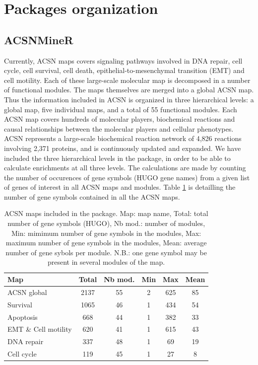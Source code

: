 \documentclass[article]{jss}
\begin{document}
\section[Packages organization]{Packages organization}

\subsection{ACSNMineR}
Currently, ACSN maps covers signaling pathways involved in DNA repair, cell
cycle, cell survival, cell death, epithelial-to-mesenchymal transition (EMT) and
cell motility. Each of these large-scale molecular map is decomposed in a number
of functional modules. The maps themselves are merged into a global ACSN map.
Thus the information included in ACSN is organized in three hierarchical levels:
a global map, five individual maps, and a total of 55 functional modules. Each
ACSN map covers hundreds of molecular players, biochemical reactions and causal
relationships between the molecular players and cellular phenotypes.  ACSN
represents a large-scale biochemical reaction network of 4,826 reactions
involving 2,371 proteins, and is continuously updated and expanded.  We have
included the three hierarchical levels in the  package, in order
to be able to calculate enrichments at all three levels. The calculations are
made by counting the number of occurences of gene symbols (HUGO gene names) from
a given list of genes of interest in all ACSN maps and modules. Table
\ref{tab:table1} is detailling the number of gene symbols contained in all the ACSN
maps.


\begin{table}[h!]
 \centering
  \caption{ACSN maps included in the  package. Map: map name, Total: total
  number of gene symbols (HUGO), Nb mod.: number of modules, Min: mimimum
  number of gene symbols in the modules, Max: maximum number of gene symbols in
  the modules, Mean: average number of gene sybols per module. N.B.: one gene
  symbol may be present in several modules of the map.}
  \label{tab:table1}
  \begin{tabular}{l|c|c|c|c|c}
    \hline
    Map & Total & Nb mod. & Min & Max & Mean\\
    \hline
  ACSN global & 2137 & 55 & 2 &625& 85\\
  Survival  &1065&46  &1 &434 &54\\
  Apoptosis & 668&44 & 1& 382& 33\\
  EMT \& Cell motility &620 &41  &1 &615 &43\\
  DNA repair &337&48  &1 &69  &19\\
  Cell cycle &119&45  &1 &27  &8\\
  \hline

  \end{tabular}

\end{table}
\end{document}
